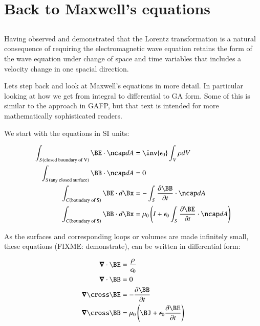 \chapter{Back to Maxwell's equations}\label{chap:PJMaxwell2}
\date{ July 12, 2008. Revised $Date: 2009/06/04 13:13:27 $}


\section{}

Having observed and demonstrated that the Lorentz transformation is a natural consequence of requiring the electromagnetic wave equation retains the
form of the wave equation under change of space and time variables that includes a velocity change in one spacial direction.

Lets step back and look at Maxwell's equations in more detail.  In particular looking at how we get from integral to differential
to GA form.  Some of this is similar to the approach in GAFP, but that text is intended for more mathematically sophisticated readers.

We start with the equations in SI units:

\begin{align*}
\int_{S(\text{closed boundary of V})} \BE \cdot \ncap dA &= \inv{\epsilon_0} \int_V \rho dV \\
\int_{S(\text{any closed surface})} \BB \cdot \ncap dA &= 0 \\
\int_{C(\text{boundary of S})} \BE \cdot d\Bx &= - \int_{S} \frac{\partial \BB}{\partial t} \cdot \ncap dA \\
\int_{C(\text{boundary of S})} \BB \cdot d\Bx &= \mu_0\left(I + \epsilon_0\int_{S} \frac{\partial \BE}{\partial t} \cdot \ncap dA\right) \\
\end{align*}

As the surfaces and corresponding loops or volumes are made infinitely small, these equations (FIXME: demonstrate), can be written in differential form:

\begin{align*}
\spacegrad \cdot \BE &= \frac{\rho}{\epsilon_0} \\
\spacegrad \cdot \BB &= 0 \\
\spacegrad \cross \BE &= - \frac{\partial \BB}{\partial t} \\
\spacegrad \cross \BB &= \mu_0\left(\BJ + \epsilon_0 \frac{\partial \BE}{\partial t}\right) \\
\end{align*}

